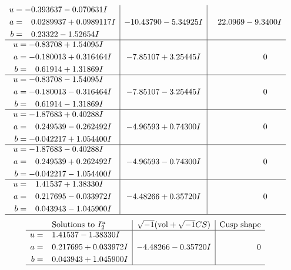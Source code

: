 \documentclass[1p]{elsarticle_modified}
\theoremstyle{definition}
\newcommand{\I}{\sqrt{-1}}
\begin{document}
$$\begin{array}{c|c|c}
\begin{aligned}
u &= -0.393637 - 0.070631 I \\
a &= \phantom{-}0.0289937 + 0.0989117 I \\
b &= \phantom{-}0.23322 - 1.52654 I\end{aligned}
 & -10.43790 - 5.34925 I & \phantom{-}22.0969 - 9.3400 I \\ \hline\begin{aligned}
u &= -0.83708 + 1.54095 I \\
a &= -0.180013 + 0.316464 I \\
b &= \phantom{-}0.61914 + 1.31869 I\end{aligned}
 & -7.85107 + 3.25445 I & \phantom{-0.000000 } 0 \\ \hline\begin{aligned}
u &= -0.83708 - 1.54095 I \\
a &= -0.180013 - 0.316464 I \\
b &= \phantom{-}0.61914 - 1.31869 I\end{aligned}
 & -7.85107 - 3.25445 I & \phantom{-0.000000 } 0 \\ \hline\begin{aligned}
u &= -1.87683 + 0.40288 I \\
a &= \phantom{-}0.249539 - 0.262492 I \\
b &= -0.042217 + 1.054400 I\end{aligned}
 & -4.96593 + 0.74300 I & \phantom{-0.000000 } 0 \\ \hline\begin{aligned}
u &= -1.87683 - 0.40288 I \\
a &= \phantom{-}0.249539 + 0.262492 I \\
b &= -0.042217 - 1.054400 I\end{aligned}
 & -4.96593 - 0.74300 I & \phantom{-0.000000 } 0 \\ \hline\begin{aligned}
u &= \phantom{-}1.41537 + 1.38330 I \\
a &= \phantom{-}0.217695 - 0.033972 I \\
b &= \phantom{-}0.043943 - 1.045900 I\end{aligned}
 & -4.48266 + 0.35720 I & \phantom{-0.000000 } 0\\
 \hline 
 \end{array}$$\newpage$$\begin{array}{c|c|c}  
\text{Solutions to }I^u_{2}& \I (\text{vol} + \sqrt{-1}CS) & \text{Cusp shape}\\
 \hline 
\begin{aligned}
u &= \phantom{-}1.41537 - 1.38330 I \\
a &= \phantom{-}0.217695 + 0.033972 I \\
b &= \phantom{-}0.043943 + 1.045900 I\end{aligned}
 & -4.48266 - 0.35720 I & \phantom{-0.000000 } 0\\
 \hline 
 \end{array}$$\newpage
\end{document}
